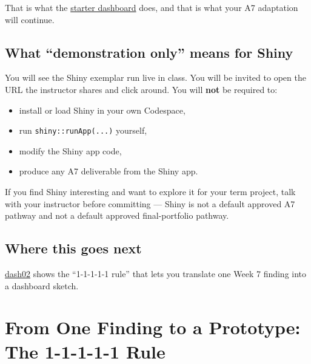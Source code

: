 \documentclass[
  letterpaper,
  DIV=11,
  numbers=noendperiod,
  oneside]{scrreprt}
\providecommand{\tightlist}{%
  \setlength{\itemsep}{0pt}\setlength{\parskip}{0pt}}
\begin{document}
That is what the \href{dash03-starter-dashboard.qmd}{starter dashboard}
does, and that is what your A7 adaptation will continue.

\section*{What ``demonstration only'' means for
Shiny}\label{what-demonstration-only-means-for-shiny}


You will see the Shiny exemplar run live in class. You will be invited
to open the URL the instructor shares and click around. You will
\textbf{not} be required to:

\begin{itemize}
\tightlist
\item
  install or load Shiny in your own Codespace,
\item
  run \texttt{shiny::runApp(...)} yourself,
\item
  modify the Shiny app code,
\item
  produce any A7 deliverable from the Shiny app.
\end{itemize}

If you find Shiny interesting and want to explore it for your term
project, talk with your instructor before committing --- Shiny is not a
default approved A7 pathway and not a default approved final-portfolio
pathway.

\section*{Where this goes next}\label{where-this-goes-next-14}


\href{dash02-from-eda-to-prototype.qmd}{dash02} shows the ``1-1-1-1-1
rule'' that lets you translate one Week 7 finding into a dashboard
sketch.

\chapter*{From One Finding to a Prototype: The 1-1-1-1-1
Rule}\label{from-one-finding-to-a-prototype-the-1-1-1-1-1-rule}
\end{document}
